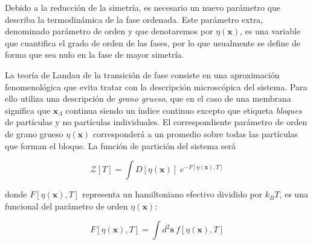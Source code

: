 Debido a la reducción de la simetría, es necesario un nuevo parámetro que 
describa la termodinámica de la fase ordenada. Este parámetro
extra, denominado parámetro de orden y que denotaremos por $\eta(\mathbf{x})$, es una
variable que cuantifica el grado de orden de
las fases, por lo que usualmente se define de forma que sea nulo en la fase
de mayor simetría.

\begin{figure}[h]
\centering
{}
\quad
{}
\end{figure}




La teoría de Landau de la transición de fase consiste en una aproximación fenomenológica
que evita tratar con la descripción microscópica del sistema. Para ello utiliza una
descripción de \textit{grano grueso}, que en el caso de una membrana significa
que $\mathbf{x}_{\Lambda}$ continua siendo un índice continuo excepto que etiqueta
\textit{bloques} de partículas y no partículas individuales. El
correspondiente parámetro de orden de grano grueso $\eta(\mathbf{x})$
corresponderá a un promedio sobre todas las partículas que forman el bloque. 
La función de partición del sistema será

\begin{equation*}
\mathcal{Z}[T]=\int D[\eta(\mathbf{x})]\; e^{-F[\eta(\mathbf{x}),T]}
\end{equation*}

donde $F[\eta(\mathbf{x}),T]$ representa un hamiltoniano efectivo dividido por
$k_BT$, es una funcional del parámetro de orden $\eta(\mathbf{x})$:

\begin{equation*}
F[\eta(\mathbf{x}),T]=\int\! d^2\mathbf{s}\ f[\eta(\mathbf{x}),T]
\end{equation*}

